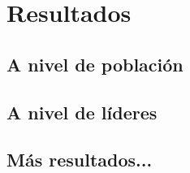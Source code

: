 \chapter{Resultados}

\section{A nivel de población}

\section{A nivel de líderes}

\section{Más resultados...}